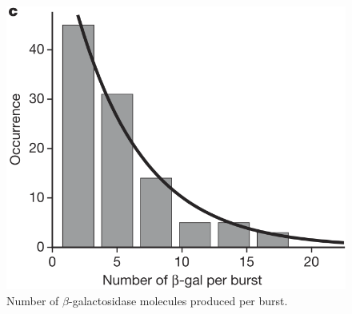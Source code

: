 \documentclass[11pt]{exam}
\begin{document}
\begin{questions}
\begin{figure}[!htb]
        \centering
        \includegraphics[scale=0.75]{Figures/geom.png}
        \caption{Number of $\beta$-galactosidase molecules produced per burst.}
    \end{figure}



\newpage


\end{questions}
\end{document}
